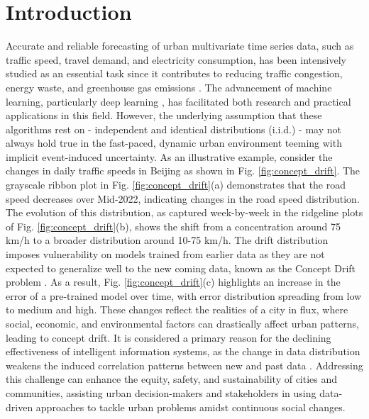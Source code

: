 \documentclass[sigconf]{acmart}
\begin{document}
\section{Introduction}
Accurate and reliable forecasting of urban multivariate time series data, such as traffic speed, travel demand, and electricity consumption, has been intensively studied as an essential task since it contributes to reducing traffic congestion, energy waste, and greenhouse gas emissions \cite{ruan2020dynamic,jia2017spatial,yao2018deep,jiang2019deepurbanevent,jiang2023spatio}. The advancement of machine learning, particularly deep learning \cite{vaswani2017attention,li2018diffusion}, has facilitated both research and practical applications in this field. However, the underlying assumption that these algorithms rest on - independent and identical distributions (i.i.d.) - may not always hold true in the fast-paced, dynamic urban environment teeming with implicit event-induced uncertainty. As an illustrative example, consider the changes in daily traffic speeds in Beijing as shown in Fig. \ref{fig:concept_drift}. The grayscale ribbon plot in Fig. \ref{fig:concept_drift}(a) demonstrates that the road speed decreases over Mid-2022, indicating changes in the road speed distribution. The evolution of this distribution, as captured week-by-week in the ridgeline plots of Fig. \ref{fig:concept_drift}(b), shows the shift from a concentration around 75 km/h to a broader distribution around 10-75 km/h. The drift distribution imposes vulnerability on models trained from earlier data as they are not expected to generalize well to the new coming data, known as the Concept Drift problem \cite{widmer1996learning}. As a result, Fig. \ref{fig:concept_drift}(c) highlights an increase in the error of a pre-trained model over time, with error distribution spreading from low to medium and high. These changes reflect the realities of a city in flux, where social, economic, and environmental factors can drastically affect urban patterns, leading to concept drift. It is considered a primary reason for the declining effectiveness of intelligent information systems, as the change in data distribution weakens the induced correlation patterns between new and past data \cite{lu2018learning}. Addressing this challenge can enhance the equity, safety, and sustainability of cities and communities, assisting urban decision-makers and stakeholders in using data-driven approaches to tackle urban problems amidst continuous social changes.
\end{document}
